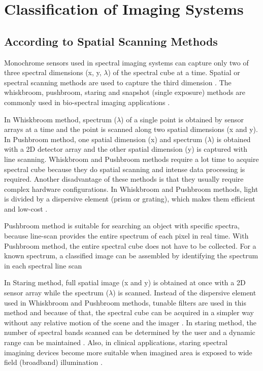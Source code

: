\documentclass[a4paper]{article}
\begin{document}

 \section{Classification of Imaging Systems} %
    \label{sec:Classification_of_Imaging_Systems}
   

  

    \subsection{According to Spatial Scanning Methods} %
    \label{sub:According_to_Spatial_Scanning_Methods}
    
    \hspace{5mm} Monochrome sensors used in spectral imaging systems can capture only two of three spectral dimensions (x, y, $\lambda$) of the spectral cube at a time. Spatial or spectral scanning methods are used to capture the third dimension \cite{dokuz}. The whiskbroom, pushbroom, staring and snapshot (single exposure) methods are commonly used in bio-spectral imaging applications \cite{bes}.
		
     \medskip   
	 \hspace{5mm} In Whiskbroom method, spectrum ($\lambda$) of a single point is obtained by sensor arrays at a time and the point is scanned along two spatial dimensions (x and y). In Pushbroom method, one spatial dimension (x) and spectrum ($\lambda$) is obtained with a 2D detector array and the other spatial dimension (y) is captured with line scanning. Whiskbroom and Pushbroom methods require a lot time to acquire spectral cube because they do spatial scanning and intense data processing is required. Another disadvantage of these methods is that they usually require complex hardware configurations. In Whiskbroom and Pushbroom methods, light is divided by a dispersive element (prism or grating), which makes them efficient and low-cost \cite{bes}.

	 \medskip   
	 \hspace{5mm} Pushbroom method is suitable for searching an object with specific spectra, because line-scan provides the entire spectrum of each pixel in real time. With Pushbroom method, the entire spectral cube does not have to be collected. For a known spectrum, a classified image can be assembled by identifying the spectrum in each spectral line scan \cite{on}

	\medskip   
	 \hspace{5mm} In Staring method, full spatial image (x and y) is obtained at once with a 2D sensor array while the spectrum ($\lambda$) is scanned. Instead of the dispersive element used in Whiskbroom and Pushbroom methods, tunable filters are used in this method and because of that, the spectral cube can be acquired in a simpler way without any relative motion of the scene and the imager \cite{oniki}. In staring method, the number of spectral bands scanned can be determined by the user and a dynamic range can be maintained \cite{bes}. Also, in clinical applications, staring spectral imagining devices become more suitable when imagined area is exposed to wide field (broadband) illumination \cite{dokuz}.
     
\end{document}
